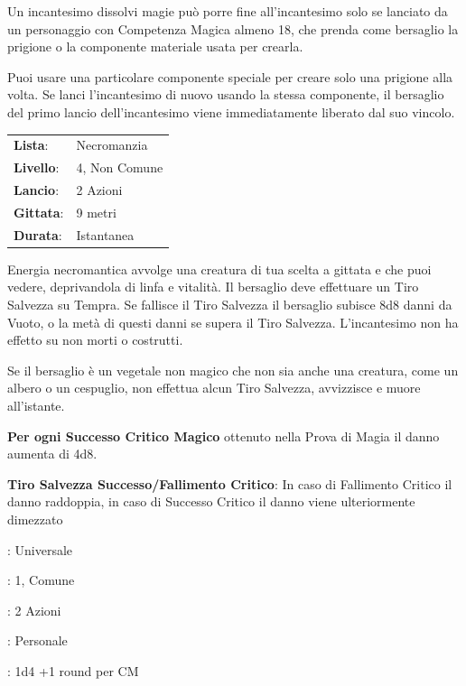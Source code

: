 \begin{multicols}{2}
Un incantesimo dissolvi magie può porre fine all'incantesimo solo se lanciato da un personaggio con Competenza Magica almeno 18, che prenda come bersaglio la prigione o la componente materiale usata per crearla.

Puoi usare una particolare componente speciale per creare solo una prigione alla volta. Se lanci l'incantesimo di nuovo usando la stessa componente, il bersaglio del primo lancio dell'incantesimo viene immediatamente liberato dal suo vincolo.

\noindent\begin{tabularx}{\linewidth}{p{1.3cm}X}
	\rowcolor{gray!20}\textbf{Lista}: & Necromanzia \\
	\textbf{Livello}: & 4, Non Comune \\
	\rowcolor{gray!20}\textbf{Lancio}: & 2 Azioni \\
	\textbf{Gittata}: & 9 metri \\
	\rowcolor{gray!20}\textbf{Durata}: & Istantanea \\
\end{tabularx}\smallskip
Energia necromantica avvolge una creatura di tua scelta a gittata e che puoi vedere, deprivandola di linfa e vitalità. Il bersaglio deve effettuare un Tiro Salvezza su Tempra. Se fallisce il Tiro Salvezza il bersaglio subisce 8d8 danni da Vuoto, o la metà di questi danni se supera il Tiro Salvezza. L'incantesimo non ha effetto su non morti o costrutti.

Se il bersaglio è un vegetale non magico che non sia anche una creatura, come un albero o un cespuglio, non effettua alcun Tiro Salvezza, avvizzisce e muore all'istante.

\textbf{Per ogni Successo Critico Magico} ottenuto nella Prova di Magia il danno aumenta di 4d8.

\textbf{Tiro Salvezza Successo/Fallimento Critico}: In caso di Fallimento Critico il danno raddoppia, in caso di Successo Critico il danno viene ulteriormente dimezzato

\begin{description}[noitemsep, topsep=0pt, parsep=0pt, partopsep=0pt, leftmargin=0cm, labelwidth=1.3cm]
	\item[\textbf{Lista}]: Universale
	\item[\textbf{Livello}]: 1, Comune
	\item[\textbf{Lancio}]: 2 Azioni
	\item[\textbf{Gittata}]: Personale
	\item[\textbf{Durata}]: 1d4 +1 round per CM
\end{description}


\end{multicols}
